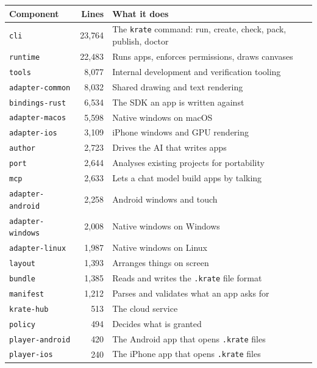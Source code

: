\documentclass[11pt,a4paper]{report}
\begin{document}
\begin{center}
\begin{longtable}{lrp{7.4cm}}
\toprule
\textbf{Component} & \textbf{Lines} & \textbf{What it does} \\
\midrule
\endhead
\texttt{cli} & 23{,}764 & The \texttt{krate} command: run, create, check, pack, publish, doctor \\
\texttt{runtime} & 22{,}483 & Runs apps, enforces permissions, draws canvases \\
\texttt{tools} & 8{,}077 & Internal development and verification tooling \\
\texttt{adapter-common} & 8{,}032 & Shared drawing and text rendering \\
\texttt{bindings-rust} & 6{,}534 & The SDK an app is written against \\
\texttt{adapter-macos} & 5{,}598 & Native windows on macOS \\
\texttt{adapter-ios} & 3{,}109 & iPhone windows and GPU rendering \\
\texttt{author} & 2{,}723 & Drives the AI that writes apps \\
\texttt{port} & 2{,}644 & Analyses existing projects for portability \\
\texttt{mcp} & 2{,}633 & Lets a chat model build apps by talking \\
\texttt{adapter-android} & 2{,}258 & Android windows and touch \\
\texttt{adapter-windows} & 2{,}008 & Native windows on Windows \\
\texttt{adapter-linux} & 1{,}987 & Native windows on Linux \\
\texttt{layout} & 1{,}393 & Arranges things on screen \\
\texttt{bundle} & 1{,}385 & Reads and writes the \texttt{.krate} file format \\
\texttt{manifest} & 1{,}212 & Parses and validates what an app asks for \\
\texttt{krate-hub} & 513 & The cloud service \\
\texttt{policy} & 494 & Decides what is granted \\
\texttt{player-android} & 420 & The Android app that opens \texttt{.krate} files \\
\texttt{player-ios} & 240 & The iPhone app that opens \texttt{.krate} files \\
\bottomrule
\end{longtable}
\end{center}
\end{document}
